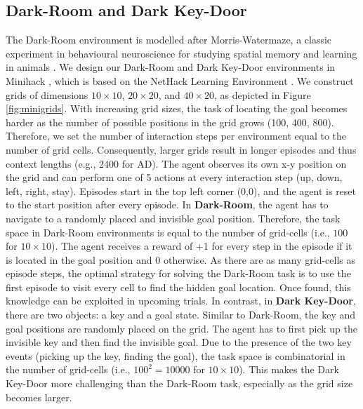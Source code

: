 \documentclass{article}
\begin{document}
\subsection{Dark-Room and Dark Key-Door} \label{appendix:env-data-dark}
The Dark-Room environment is modelled after Morris-Watermaze, a classic experiment in behavioural neuroscience for studying spatial memory and learning in animals \citep{Hooge:01}.
We design our Dark-Room and Dark Key-Door environments in Minihack \citep{Samvelyan:2021}, which is based on the NetHack Learning Environment \citep{kuttler2020nethack}.
We construct grids of dimensions $10\times 10$, $20\times20$, and $40\times20$, as depicted in Figure \ref{fig:minigrids}.
With increasing grid sizes, the task of locating the goal becomes harder as the number of possible positions in the grid grows (100, 400, 800).
Therefore, we set the number of interaction steps per environment equal to the number of grid cells.
Consequently, larger grids result in longer episodes and thus context lengths (e.g., 2400 for AD).
The agent observes its own x-y position on the grid and can perform one of 5 actions at every interaction step (up, down, left, right, stay).
Episodes start in the top left corner (0,0), and the agent is reset to the start position after every episode.
In \textbf{Dark-Room}, the agent has to navigate to a randomly placed and invisible goal position.
Therefore, the task space in Dark-Room environments is equal to the number of grid-cells (i.e., $100$ for $10\times10$).
The agent receives a reward of +1 for every step in the episode if it is located in the goal position and 0 otherwise.
As there are as many grid-cells as episode steps, the optimal strategy for solving the Dark-Room task is to use the first episode to visit every cell to find the hidden goal location.
Once found, this knowledge can be exploited in upcoming trials.
In contrast, in \textbf{Dark Key-Door}, there are two objects: a key and a goal state.
Similar to Dark-Room, the key and goal positions are randomly placed on the grid.
The agent has to first pick up the invisible key and then find the invisible goal.
Due to the presence of the two key events (picking up the key, finding the goal), the task space is combinatorial in the number of grid-cells (i.e., $100^2=10000$ for $10\times10$).
This makes the Dark Key-Door more challenging than the Dark-Room task, especially as the grid size becomes larger.
\end{document}
